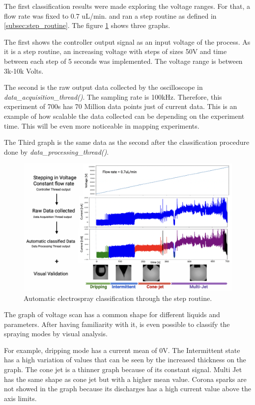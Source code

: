 The first classification results were made exploring the voltage ranges. 
For that, a flow rate was fixed to 0.7 uL/min. and ran a step routine as defined in \ref{subsec:step_routine}. 
The figure \ref{fig:step_class} shows three graphs. 

The first shows the controller output signal as an input voltage of the process. As it is a step routine, an increasing voltage with steps of sizes 50V and time between each step of 5 seconds was implemented. The voltage range is between 3k-10k Volts.

The second is the raw output data collected by the oscilloscope in \emph{data\_acquisition\_thread()}. 
The sampling rate is 100kHz. Therefore, this experiment of 700s has 70 Million data points just of current data. 
This is an example of how scalable the data collected can be depending on the experiment time. This will be even more noticeable in mapping experiments.

The Third graph is the same data as the second after the classification procedure done by \emph{data\_processing\_thread()}. 


\begin{figure}[H]
    \center
    \includegraphics[width=16cm]{Figuras/may/step_class.png}
    \caption{Automatic electrospray classification through the step routine.}
    \label{fig:step_class}
\end{figure}

The graph of voltage scan has a common shape for different liquids and parameters. After having familiarity with it, is even possible to classify the spraying modes by visual analysis. 

For example, dripping mode has a current mean of 0V. The Intermittent state has a high variation of values that can be seen by the increased thickness on the graph. The cone jet is a thinner graph because of its constant signal. Multi Jet  has the same shape as cone jet but with a higher mean value. Corona sparks are not showed in the graph because its discharges has a high current value above the axis limits.



